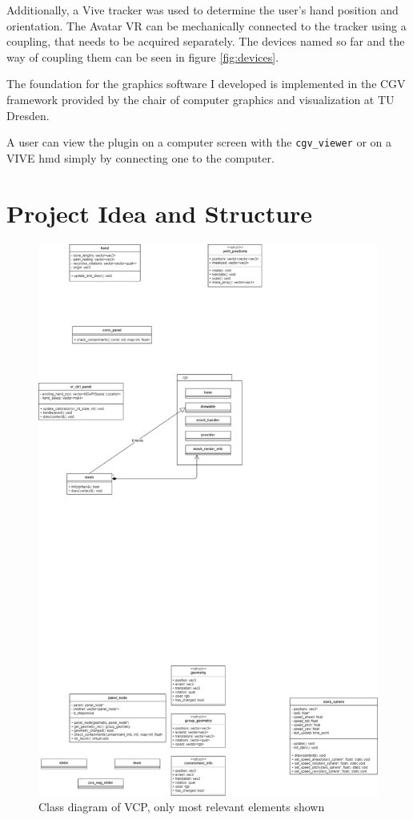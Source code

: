 \documentclass[hyperref, bachelorofscience]{cgvpub}
\begin{document}
Additionally, a Vive tracker was used to determine the user's hand position and orientation. The Avatar VR can be mechanically connected to the tracker using a coupling, that needs to be acquired separately. The devices named so far and the way of coupling them can be seen in figure \ref{fig:devices}.

The foundation for the graphics software I developed is implemented in the \gls{CGV} framework provided by the chair of computer graphics and visualization at TU Dresden.

A user can view the plugin on a computer screen with the \lstinline|cgv_viewer| or on a \Gls{VIVE} \acrfull{hmd} simply by connecting one to the computer.

\section{Project Idea and Structure}
\begin{figure}
	\includegraphics[width=\linewidth]{../pics/uml}
	\caption[Class diagram of \gls{VCP}]{Class diagram of \gls{VCP}, only most relevant elements shown}
	\label{fig:uml}
\end{figure}
\end{document}

